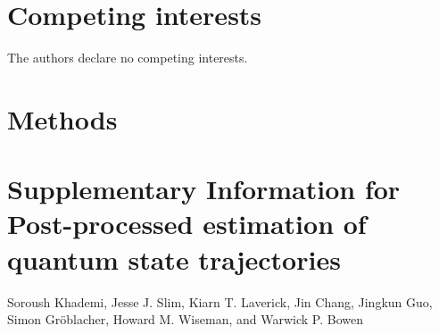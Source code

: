 \documentclass[aps,prx,twocolumn,amsmath,amssymb,superscriptaddress,floatfix,longbibliography
]{revtex4-2}
\begin{document}
\section*{Competing interests}
\noindent
The authors declare no competing interests.




\section*{Methods}
\setcounter{section}{0}

\renewcommand{\figurename}{Extended Data FIG.}\setcounter{figure}{0}
\makeatletter
\renewcommand{\theHfigure}{ED.\arabic{figure}}
\makeatother
\renewcommand{\tablename}{Extended Data TABLE}\setcounter{table}{0}




\onecolumngrid
\newpage
\section*{Supplementary Information for\\Post-processed estimation of quantum state trajectories}
\begin{center}
  Soroush Khademi, Jesse J. Slim, Kiarn T. Laverick, Jin Chang, Jingkun Guo,\\Simon Gröblacher, Howard M. Wiseman, and Warwick P. Bowen
\end{center}
\renewcommand{\thesection}{S\arabic{section}}\setcounter{section}{0}
\renewcommand{\thesubsection}{S\arabic{section}.\arabic{subsection}}
\renewcommand{\theequation}{S\arabic{equation}}\setcounter{equation}{0}
\renewcommand{\figurename}{FIG.}
\renewcommand{\thefigure}{S\arabic{figure}}\setcounter{figure}{0}
\makeatletter
\renewcommand{\theHfigure}{S.\arabic{figure}}
\makeatother
\renewcommand{\tablename}{TABLE}
\renewcommand{\thetable}{S\arabic{table}}\setcounter{table}{0}

\end{document}
